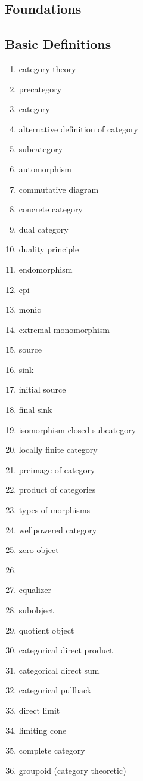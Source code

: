 \documentclass[12pt]{article}
\begin{document}
\begin{multicols}{2}

\section{Foundations}

\subsection{Basic Definitions}
\begin{enumerate}
\item category theory
\item precategory
\item category
\item alternative definition of category
\item subcategory
\item automorphism
\item commutative diagram
\item concrete category
\item dual category
\item duality principle
\item endomorphism
\item epi
\item monic
\item extremal monomorphism
\item source
\item sink
\item initial source
\item final sink
\item isomorphism-closed subcategory
\item locally finite category
\item preimage of category
\item product of categories
\item types of morphisms
\item wellpowered category
\item zero object
\item {}
\item equalizer
\item subobject
\item quotient object
\item categorical direct product
\item categorical direct sum
\item categorical pullback
\item direct limit
\item limiting cone
\item complete category
\item groupoid (category theoretic)
\end{enumerate}


\end{multicols}
\end{document}
